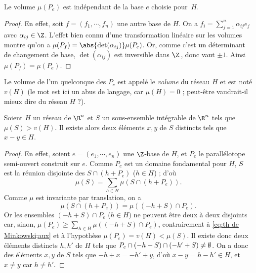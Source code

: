 \documentclass[11pt, useosf,
  title in boldface,
  theorem in new line,
  theorem numbering = section,
  number theorems separately,
]{simplivre}
\begin{document}
    \begin{lemma}
        Le volume \( \mu(P_e) \) est indépendant de la base \( e \) choisie pour~\( H \).
    \end{lemma}
    \begin{proof}
        En effet, soit \( f = (f_1, \cdots, f_n) \) une autre base de \( H \). On a \( f_i = \sum_{j=1}^n \alpha_{ij}e_j \) avec \( \alpha_{ij} \in \Z \). L'effet bien connu d'une transformation linéaire sur les volumes montre qu'on a \( \mu(P_f) = \abs{\det(\alpha_{ij})} \mu(P_e) \). Or, comme c'est un déterminant de changement de base, \( \det(\alpha_{ij}) \) est inversible dans \( \Z \)\,, donc vaut \( \pm 1 \). Ainsi \( \mu(P_f) = \mu(P_e) \).
    \end{proof}

    Le volume de l'un quelconque des \( P_e \) est appelé le \emph{volume} du réseau \( H \) et est noté \( v(H) \) (le mot  est ici un abus de langage, car \( \mu(H) = 0 \) ; peut-être vaudrait-il mieux dire  du réseau \( H \) ?).

    \begin{theorem}[Minkowski]\label{thm:Minkowski}
        Soient \( H \) un réseau de \( \R^n \) et \( S \) un sous-ensemble intégrable de \( \R^n \) tels que \( \mu(S) > v(H) \). Il existe alors deux éléments \( x, y \) de \( S \) distincts tels que \( x-y \in H \).
    \end{theorem}
    \begin{proof}
        En effet, soient \( e = (e_1, \cdots, e_n) \) une \( \Z \)‑base de \( H \), et \( P_e \) le parallélotope semi-ouvert construit sur \( e \). Comme \( P_e \) est un domaine fondamental pour \( H \), \( S \) est la réunion disjointe des \( S \cap (h + P_e) \) (\( h \in H \)) ; d'où
        \begin{equation}\label{eq:th de Minkowski;aux}
            \mu(S) = \sum_{h \in H} \mu(S \cap (h+P_e)).
        \end{equation}
        Comme \( \mu \) est invariante par translation, on a
        \[
            \mu(S \cap (h+P_e)) = \mu((-h+S) \cap P_e).
        \]
        Or les ensembles \( (-h+S) \cap P_e \) (\( h \in H \)) ne peuvent être deux à deux disjoints car, sinon, \( \mu(P_e) \geqslant \sum_{h \in H} \mu((-h+S) \cap P_e) \), contrairement à \eqref{eq:th de Minkowski;aux} et à l'hypothèse \( \mu(P_e) = v(H) < \mu(S) \). Il existe donc deux éléments distincts \( h, h' \) de \( H \) tels que \( P_e \cap (-h+S) \cap (-h'+S) \neq\nobreak \emptyset \). On a donc des éléments \( x, y \) de \( S \) tels que \( -h + x = -h' + y \), d'où \( x-y = h-h' \in H \), et \( x \neq y \) car \( h \neq h' \).
    \end{proof}
\end{document}
